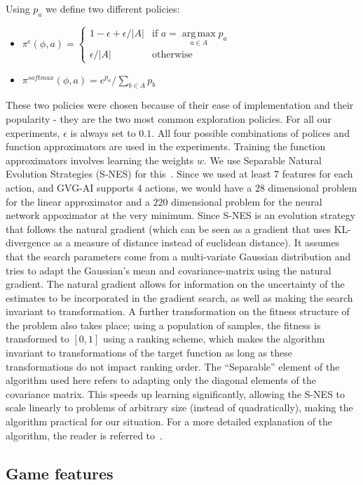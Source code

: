 \documentclass[conference]{IEEEtran}
\DeclareMathOperator*{\argmax}{arg\,max}
\newcommand{\twopartdefo}[3]
{
  \left\{
    \begin{array}{ll}
      #1 & \mbox{if } #2 \\
      #3 & \mbox{otherwise}
    \end{array}
  \right.
}
\begin{document}
Using $p_a$ we define two different policies:

\begin{itemize}
\item $\pi^\epsilon(\phi,a) = \twopartdefo{ 1-\epsilon + \epsilon/|A| }{ a = \argmax\limits_{a \in A}  p_a}{\epsilon/|A|}$
\item $\pi^{softmax}(\phi,a) = e^{p_a}/ \sum\limits_{b \in A} p_b $
\end{itemize}

These two policies were chosen because of their ease of implementation and their popularity - they are the two most common exploration policies. For all our experiments, $\epsilon$ is always set to $0.1$. All four possible combinations of polices and function approximators are used in the experiments. Training the function approximators involves learning the weights $w$. We use Separable Natural Evolution Strategies (S-NES) for this~\cite{schaul2011high}. Since we used at least $7$ features for each action, and GVG-AI supports $4$ actions, we would have a $28$ dimensional problem for the linear approximator and a $220$ dimensional problem for the neural network appoximator at the very minimum. Since S-NES is an evolution strategy that follows the natural gradient (which can be seen as a gradient that uses KL-divergence as a measure of distance instead of euclidean distance). It assumes that the search parameters come from a multi-variate Gaussian distribution and tries to adapt the Gaussian's mean and covariance-matrix using the natural gradient. The natural gradient allows for information on the uncertainty of the estimates to be incorporated in the gradient search, as well as making the search invariant to transformation. A further transformation on the fitness structure of the problem also takes place; using a population of samples, the fitness is transformed to $[0,1]$ using a ranking scheme, which makes the algorithm invariant to transformations of the target function as long as these transformations do not impact ranking order. The ``Separable'' element of the algorithm used here refers to adapting only the diagonal elements of the covariance matrix. This speeds up learning significantly, allowing the S-NES to scale linearly to problems of arbitrary size (instead of quadratically), making the algorithm practical for our situation. For a more detailed explanation of the algorithm, the reader is referred to~\cite{schaul2011high}. 

\subsection{Game features} \label{ssec:feat}
\end{document}
